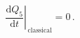 \begin{equation} \label{Q5conservation}
\left. \frac{\mathrm{d}Q_5}{\mathrm{d}t} \right|_\mathrm{\,classical}=0\,.
\end{equation}

